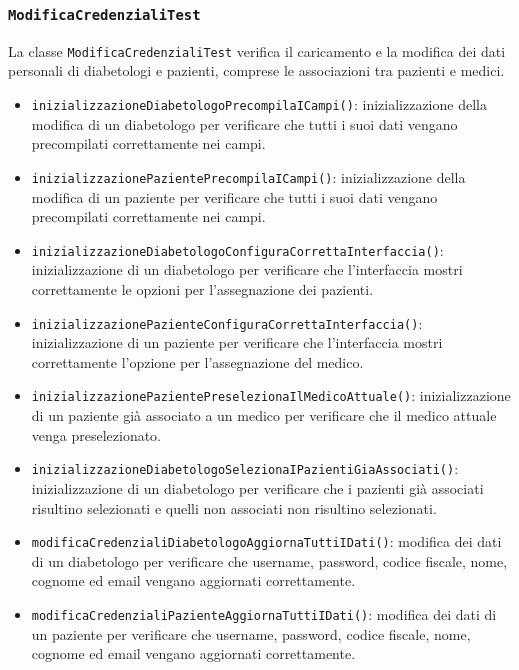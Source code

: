 \subsubsection*{\texttt{ModificaCredenzialiTest}}

La classe \texttt{ModificaCredenzialiTest} verifica il caricamento e la modifica dei dati personali di diabetologi e pazienti, comprese le associazioni tra pazienti e medici.

\begin{itemize}
	
	\item \texttt{inizializzazioneDiabetologoPrecompilaICampi()}: inizializzazione della modifica di un diabetologo per verificare che tutti i suoi dati vengano precompilati correttamente nei campi.
	
	\item \texttt{inizializzazionePazientePrecompilaICampi()}: inizializzazione della modifica di un paziente per verificare che tutti i suoi dati vengano precompilati correttamente nei campi.
	
	\item \texttt{inizializzazioneDiabetologoConfiguraCorrettaInterfaccia()}: inizializzazione di un diabetologo per verificare che l'interfaccia mostri correttamente le opzioni per l'assegnazione dei pazienti.
	
	\item \texttt{inizializzazionePazienteConfiguraCorrettaInterfaccia()}: inizializzazione di un paziente per verificare che l'interfaccia mostri correttamente l'opzione per l'assegnazione del medico.
	
	\item \texttt{inizializzazionePazientePreselezionaIlMedicoAttuale()}: inizializzazione di un paziente già associato a un medico per verificare che il medico attuale venga preselezionato.
	
	\item \texttt{inizializzazioneDiabetologoSelezionaIPazientiGiaAssociati()}: inizializzazione di un diabetologo per verificare che i pazienti già associati risultino selezionati e quelli non associati non risultino selezionati.
	
	\item \texttt{modificaCredenzialiDiabetologoAggiornaTuttiIDati()}: modifica dei dati di un diabetologo per verificare che username, password, codice fiscale, nome, cognome ed email vengano aggiornati correttamente.
	
	\item \texttt{modificaCredenzialiPazienteAggiornaTuttiIDati()}: modifica dei dati di un paziente per verificare che username, password, codice fiscale, nome, cognome ed email vengano aggiornati correttamente.
	

\end{itemize}
